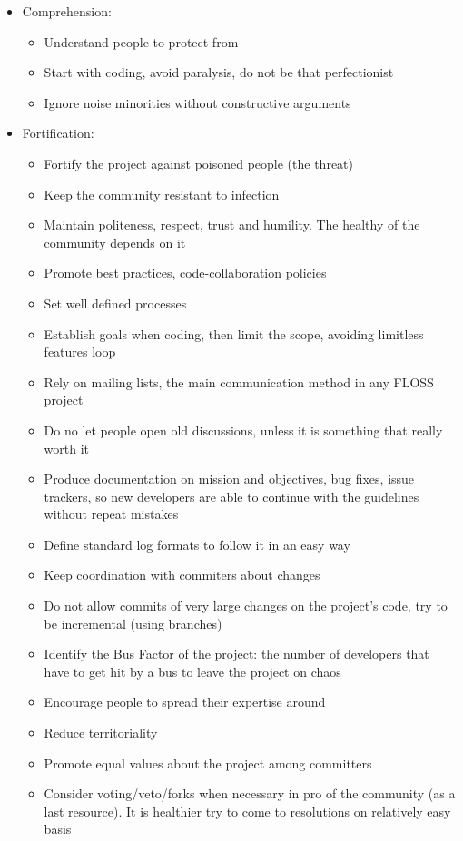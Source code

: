 \documentclass[11pt]{article} %
\begin{document}
\begin{itemize}
  \item Comprehension:
  	\begin{itemize}
  		\item Understand people to protect from
  		\item Start with coding, avoid paralysis, do not be that perfectionist
  		\item Ignore noise minorities without constructive arguments
  	\end{itemize}
  
  \item Fortification:
  	\begin{itemize}
  		\item Fortify the project against poisoned people (the threat)
  		\item Keep the community resistant to infection
  		\item Maintain politeness, respect, trust and humility. The healthy of the community depends on it
  		\item Promote best practices, code-collaboration policies
  		\item Set well defined processes
  		\item Establish goals when coding, then limit the scope, avoiding limitless features loop
  		\item Rely on mailing lists, the main communication method in any FLOSS project
  		\item Do no let people open old discussions, unless it is something that really worth it
  		\item Produce documentation on mission and objectives, bug fixes, issue trackers, so new developers are able to continue with the guidelines without repeat mistakes
  		\item Define standard log formats to follow it in an easy way
  		\item Keep coordination with commiters about changes
  		\item Do not allow commits of very large changes on the project's code, try to be incremental (using branches)
  		\item Identify the Bus Factor of the project: the number of developers that have to get hit by a bus to leave the project on chaos
  		\item Encourage people to spread their expertise around
  		\item Reduce territoriality
  		\item Promote equal values about the project among committers
  		\item Consider voting/veto/forks when necessary in pro of the community (as a last resource). It is healthier try to come to resolutions on relatively easy basis
  	\end{itemize}
  	

\end{itemize}
\end{document}
